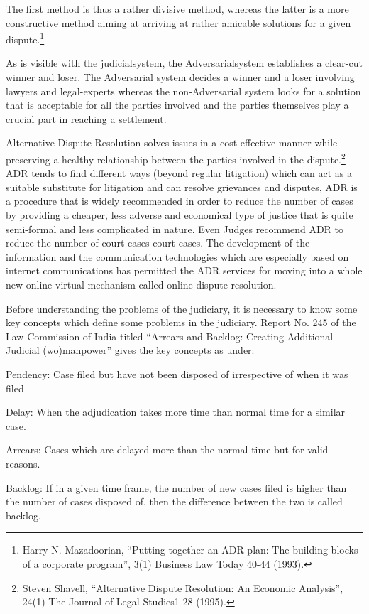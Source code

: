 \begin{multicols}{2}
\noi
The first method is thus a rather divisive method, whereas the latter is a more constructive
method aiming at arriving at rather amicable solutions for a given dispute.\footnote{ Harry N. Mazadoorian, “Putting together an ADR plan: The building blocks of a corporate program”, 3(1)
Business Law Today 40-44 (1993).}

\noi
As is visible with the judicialsystem, the Adversarialsystem establishes a clear-cut winner and
loser. The Adversarial system decides a winner and a loser involving lawyers and legal-experts
whereas the non-Adversarial system looks for a solution that is acceptable for all the parties
involved and the parties themselves play a crucial part in reaching a settlement.

\noi
Alternative Dispute Resolution solves issues in a cost-effective manner while preserving a
healthy relationship between the parties involved in the dispute.\footnote{Steven Shavell, “Alternative Dispute Resolution: An Economic Analysis”, 24(1) The Journal of Legal Studies1-28 (1995).} ADR tends to find different ways (beyond regular litigation) which can act as a suitable substitute for litigation and can resolve grievances and disputes, ADR is a procedure that is widely recommended in order to
reduce the number of cases by providing a cheaper, less adverse and economical type of justice
that is quite semi-formal and less complicated in nature. Even Judges recommend ADR to
reduce the number of court cases court cases. The development of the information and the
communication technologies which are especially based on internet communications has
permitted the ADR services for moving into a whole new online virtual mechanism called
online dispute resolution.


\noi
Before understanding the problems of the judiciary, it is necessary to know some key concepts
which define some problems in the judiciary. Report No. 245 of the Law Commission of India
titled “Arrears and Backlog: Creating Additional Judicial (wo)manpower” gives the key
concepts as under:

\noi
Pendency: Case filed but have not been disposed of irrespective of when it was filed

\noi
Delay: When the adjudication takes more time than normal time for a similar case.

\noi
Arrears: Cases which are delayed more than the normal time but for valid reasons.

\noi
Backlog: If in a given time frame, the number of new cases filed is higher than the number of
cases disposed of, then the difference between the two is called backlog.


\end{multicols}
